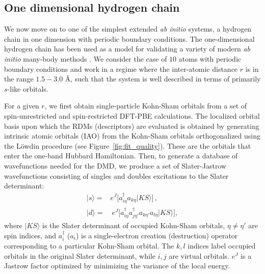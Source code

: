 \subsection{One dimensional hydrogen chain}
\label{subsection:1dhydrogen}
We now move on to one of the simplest extended \emph{ab initio} systems, a hydrogen chain in one dimension with periodic boundary conditions. The one-dimensional hydrogen chain has been used as a model for validating a variety of modern \textit{ab initio} many-body methods \cite{H10_Simons}. 
We consider the case of $10$ atoms with periodic boundary conditions and work in a regime where the inter-atomic distance $r$ is in the range $1.5 - 3.0$ \AA, such that the system is  well described in terms of primarily $s$-like orbitals. 

For a given $r$, we first obtain single-particle Kohn-Sham orbitals from a set of spin-unrestricted and 
spin-restricted DFT-PBE calculations. The localized orbital basis upon which the RDMs (descriptors) 
are evaluated is obtained by generating intrinsic atomic orbitals (IAO) \cite{knizia_intrinsic_2013} from the Kohn-Sham orbitals 
orthogonalized using the L\"owdin procedure (see Figure~\ref{fig:fit_quality}). These are the orbitals that enter the one-band Hubbard Hamiltonian. 
Then, to generate a database of wavefunctions needed for the DMD, we produce a set of Slater-Jastrow 
wavefunctions consisting of singles and doubles excitations to the Slater determinant:
\begin{subequations}
\begin{eqnarray}
| s \rangle = & e^J \Big[a^\dagger_{i \eta} a_{k \eta}   | KS \rangle \Big] \,,\\
| d \rangle = & \: e^J \Big[a^\dagger_{i \eta} a^\dagger_{j \eta'} a_{k \eta'} a_{l \eta}   | KS \rangle\Big] ,
\end{eqnarray}
\end{subequations}
where $|KS\rangle$ is the Slater determinant of occupied Kohn-Sham orbitals, $\eta \neq \eta'$ are spin indices, 
and $a_{i}^\dagger$ ($a_{i}$) is a single-electron creation (destruction) operator corresponding to a particular Kohn-Sham orbital. The $k,l$ indices label occupied orbitals in the original Slater determinant, while $i,j$ are virtual orbitals. 
$e^J$ is a Jastrow factor optimized by minimizing the variance of the local energy. 

